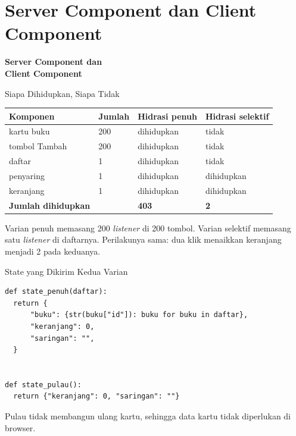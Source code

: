 \documentclass[aspectratio=169, table, 12pt]{beamer}
\begin{document}
\section{Server Component dan Client Component}

\begin{frame}{\hfill}
  \centering
  \Huge{\textbf{Server Component dan\\Client Component}}
\end{frame}

\begin{frame}{{\Large Siapa Dihidupkan, Siapa Tidak}}
  \vspace{6pt}
  \centering
  {\footnotesize
  \begin{tabularx}{\textwidth}{Ylll}
    \hline
    \textbf{Komponen} & \textbf{Jumlah} & \textbf{Hidrasi penuh} & \textbf{Hidrasi selektif} \\
    \hline
    kartu buku & 200 & dihidupkan & tidak \\
    \hline
    tombol Tambah & 200 & dihidupkan & tidak \\
    \hline
    daftar & 1 & dihidupkan & tidak \\
    \hline
    penyaring & 1 & dihidupkan & dihidupkan \\
    \hline
    keranjang & 1 & dihidupkan & dihidupkan \\
    \hline
    \textbf{Jumlah dihidupkan} & & \textbf{403} & \textbf{2} \\
    \hline
  \end{tabularx}}

  \vspace{6pt}
  {\small Varian penuh memasang 200 \textit{listener} di 200 tombol. Varian
  selektif memasang satu \textit{listener} di daftarnya. Perilakunya sama:
  dua klik menaikkan keranjang menjadi 2 pada keduanya.}
\end{frame}

\begin{frame}[fragile]{{\Large State yang Dikirim Kedua Varian}}
  \vspace{2pt}
\begin{lstlisting}[style=PythonStyle]
def state_penuh(daftar):
  return {
      "buku": {str(buku["id"]): buku for buku in daftar},
      "keranjang": 0,
      "saringan": "",
  }


def state_pulau():
  return {"keranjang": 0, "saringan": ""}
\end{lstlisting}
  \vspace{2pt}
  {\small Pulau tidak membangun ulang kartu, sehingga data kartu tidak
  diperlukan di browser.}
\end{frame}
\end{document}
